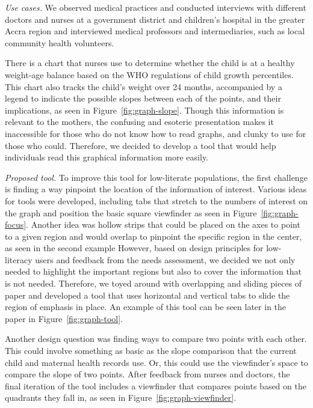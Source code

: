 \documentclass{sig-alternate}
\begin{document}
\emph{Use cases.}
We observed medical practices and conducted interviews with different doctors and nurses at a government district and children's hospital in the greater Accra region and interviewed medical professors and intermediaries, such as local community health volunteers. 

There is a chart that nurses use to determine whether the child is at a healthy weight-age balance based on the WHO regulations of child growth percentiles. This chart also tracks the child's weight over 24 months, accompanied by a legend to indicate the possible slopes between each of the points, and their implications, as seen in Figure~\ref{fig:graph-slope}. Though this information is relevant to the mothers, the confusing and esoteric presentation makes it inaccessible for those who do not know how to read graphs, and clunky to use for those who could. Therefore, we decided to develop a tool that would help individuals read this graphical information more easily.

\emph{Proposed tool.}
To improve this tool for low-literate populations, the first challenge is finding a way pinpoint the location of the information of interest. Various ideas for tools were developed, including tabs that stretch to the numbers of interest on the graph and position the basic square viewfinder as seen in Figure~\ref{fig:graph-focus}. Another idea was hollow strips that could be placed on the axes to point to a given region and would overlap to pinpoint the specific region in the center, as seen in the second example However, based on design principles for low-literacy users and feedback from the needs assessment, we decided we not only needed to highlight the important regions but also to cover the information that is not needed. Therefore, we toyed around with overlapping and sliding pieces of paper and developed a tool that uses horizontal and vertical tabs to slide the region of emphasis in place. An example of this tool can be seen later in the paper in Figure~\ref{fig:graph-tool}.

Another design question was finding ways to compare two points with each other. This could involve something as basic as the slope comparison that the current child and maternal health records use. Or, this could use the viewfinder's space to compare the slope of two points. After feedback from nurses and doctors, the final iteration of the tool includes a viewfinder that compares points based on the quadrants they fall in, as seen in Figure~\ref{fig:graph-viewfinder}.
\end{document}
